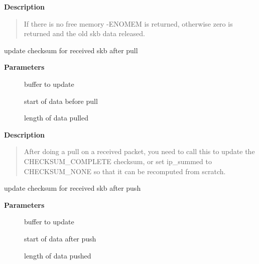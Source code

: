 \documentclass[a4paper,8pt,english]{sphinxmanual}
\begin{document}
\textbf{Description}
\begin{quote}

If there is no free memory -ENOMEM is returned, otherwise zero
is returned and the old skb data released.
\end{quote}

\begin{fulllineitems}
\label{networking/kapi:c.skb_postpull_rcsum}
update checksum for received skb after pull

\end{fulllineitems}


\textbf{Parameters}
\begin{description}
\item[{}] \leavevmode
buffer to update

\item[{}] \leavevmode
start of data before pull

\item[{}] \leavevmode
length of data pulled

\end{description}

\textbf{Description}
\begin{quote}

After doing a pull on a received packet, you need to call this to
update the CHECKSUM\_COMPLETE checksum, or set ip\_summed to
CHECKSUM\_NONE so that it can be recomputed from scratch.
\end{quote}

\begin{fulllineitems}
\label{networking/kapi:c.skb_postpush_rcsum}
update checksum for received skb after push

\end{fulllineitems}


\textbf{Parameters}
\begin{description}
\item[{}] \leavevmode
buffer to update

\item[{}] \leavevmode
start of data after push

\item[{}] \leavevmode
length of data pushed

\end{description}
\end{document}
